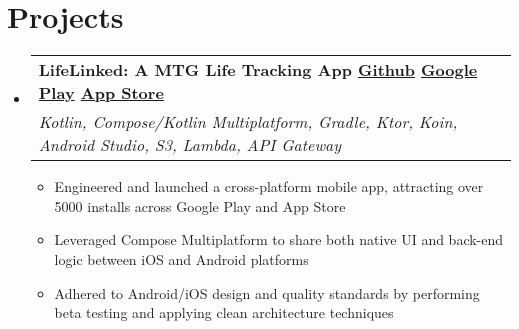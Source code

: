 \documentclass[letterpaper,11pt]{article}
\makeatletter
\newcommand\tab[1][1cm]{\hspace*{#1}}
\newcommand{\resumeItem}[1]{
  \item\small{
    {#1 \vspace{-2.pt}}
  }
}
\newcommand{\resumeSubheading}[4]{
  \vspace{-3pt}\item
    \begin{tabular*}{0.97\textwidth}[t]{l@{\extracolsep{\fill}}r}
    \vspace{-2pt}
      \textbf{#1} & \textit{#2} \\
      \textit{\small#3} & \textit{\small #4} \\
    \end{tabular*}\vspace{-7pt}
}
\newcommand{\resumeSubHeadingListStart}{\begin{itemize}[leftmargin=0.15in, label={}]}
\newcommand{\resumeSubHeadingListEnd}{\end{itemize}}
\newcommand{\resumeItemListStart}{\begin{itemize}}
\newcommand{\resumeItemListEnd}{\end{itemize}\vspace{-5pt}}
\makeatother
\begin{document}
\section{\textbf{Projects}}
  \resumeSubHeadingListStart
       \resumeSubheading
      {LifeLinked: A MTG Life Tracking App \tab[0.5cm] \href{https://github.com/ntietje1/MTG_Life_Total_App}{\raisebox{-0.05\height}\faGithub \tab[0.05cm] Github}\tab[0.5cm] \href{https://play.google.com/store/apps/details?id=com.hypeapps.lifelinked}{\raisebox{-0.05\height}\faGooglePlay \tab[0.05cm] Google Play}\tab[0.5cm] \href{https://apps.apple.com/us/app/lifelinked-mtg-life-counter/id6503708612}{\raisebox{-0.05\height}\faApple \tab[0.05cm] App Store}}{}
      {Kotlin, Compose/Kotlin Multiplatform, Gradle, Ktor, Koin, Android Studio, S3, Lambda, API Gateway}{}
      \resumeItemListStart
        \resumeItem{Engineered and launched a cross-platform mobile app, attracting over 5000 installs across Google Play and App Store}
        \resumeItem{Leveraged Compose Multiplatform to share both native UI and back-end logic between iOS and Android platforms}
        \resumeItem{Adhered to Android/iOS design and quality standards by performing beta testing and applying clean architecture techniques}
      \resumeItemListEnd
        \vspace{1pt}

  \resumeSubHeadingListEnd

\end{document}
